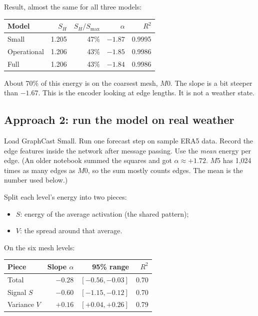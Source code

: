 \documentclass[11pt,a4paper]{article}
\begin{document}
Result, almost the same for all three models:
\begin{center}
\begin{tabular}{lrrrr}
\toprule
Model & \(S_H\) & \(S_H/S_{\max}\) & \(\alpha\) & \(R^2\) \\
\midrule
Small & 1.205 & 47\% & \(-1.87\) & 0.9995 \\
Operational & 1.206 & 43\% & \(-1.85\) & 0.9986 \\
Full & 1.206 & 43\% & \(-1.84\) & 0.9986 \\
\bottomrule
\end{tabular}
\end{center}

About 70\% of this energy is on the coarsest mesh, \(M0\).
The slope is a bit steeper than \(-1.67\).
This is the encoder looking at edge lengths. It is not a weather state.

\subsection*{Approach 2: run the model on real weather}

Load GraphCast Small. Run one forecast step on sample ERA5 data.
Record the edge features inside the network after message passing.
Use the \emph{mean} energy per edge. (An older notebook summed the squares and got \(\alpha \approx +1.72\). \(M5\) has 1{,}024 times as many edges as \(M0\), so the sum mostly counts edges. The mean is the number used below.)

Split each level's energy into two pieces:
\begin{itemize}
  \item \(S\): energy of the average activation (the shared pattern);
  \item \(V\): the spread around that average.
\end{itemize}

On the six mesh levels:

\begin{center}
\begin{tabular}{lrrr}
\toprule
Piece & Slope \(\alpha\) & 95\% range & \(R^2\) \\
\midrule
Total & \(-0.28\) & \([-0.56,-0.03]\) & 0.70 \\
Signal \(S\) & \(-0.60\) & \([-1.15,-0.12]\) & 0.70 \\
Variance \(V\) & \(+0.16\) & \([+0.04,+0.26]\) & 0.79 \\
\bottomrule
\end{tabular}
\end{center}
\end{document}
